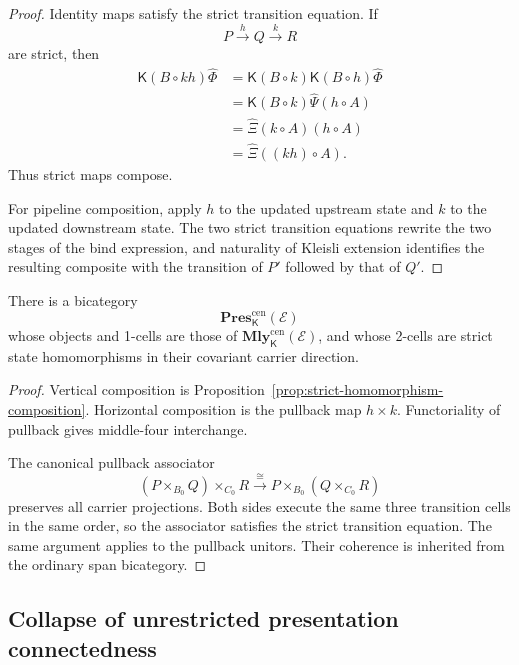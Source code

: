 \begin{proof}
Identity maps satisfy the strict transition equation.  If
\[
    P\xrightarrow{h}Q\xrightarrow{k}R
\]
are strict, then
\[
\begin{aligned}
\mathsf K(B\circ kh)\widehat\Phi
&=
\mathsf K(B\circ k)
\mathsf K(B\circ h)
\widehat\Phi
\\
&=
\mathsf K(B\circ k)
\widehat\Psi(h\circ A)
\\
&=
\widehat\Xi(k\circ A)(h\circ A)
\\
&=
\widehat\Xi((kh)\circ A).
\end{aligned}
\]
Thus strict maps compose.

For pipeline composition, apply \(h\) to the updated upstream state and
\(k\) to the updated downstream state.  The two strict transition equations
rewrite the two stages of the bind expression, and naturality of Kleisli
extension identifies the resulting composite with the transition of
\(P'\) followed by that of \(Q'\).
\end{proof}

\begin{theorem}
\label{thm:strict-presentation-bicategory}
There is a bicategory
\[
    \mathbf{Pres}^{\mathrm{cen}}_{\mathsf K}(\mathcal E)
\]
whose objects and 1-cells are those of
\(\mathbf{Mly}^{\mathrm{cen}}_{\mathsf K}(\mathcal E)\), and whose 2-cells are
strict state homomorphisms in their covariant carrier direction.
\end{theorem}

\begin{proof}
Vertical composition is
Proposition~\ref{prop:strict-homomorphism-composition}.  Horizontal
composition is the pullback map \(h\times k\).  Functoriality of pullback
gives middle-four interchange.

The canonical pullback associator
\[
    (P\times_{B_0}Q)\times_{C_0}R
    \xrightarrow{\cong}
    P\times_{B_0}(Q\times_{C_0}R)
\]
preserves all carrier projections.  Both sides execute the same three
transition cells in the same order, so the associator satisfies the strict
transition equation.  The same argument applies to the pullback unitors.
Their coherence is inherited from the ordinary span bicategory.
\end{proof}

\subsection{Collapse of unrestricted presentation connectedness}
\label{subsec:collapse-unrestricted-state-connectedness}

